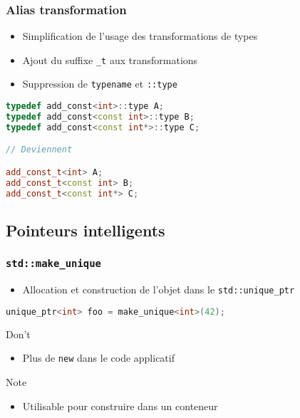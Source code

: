 \documentclass[C++.tex]{subfiles}
\begin{document}
\begin{frame}[fragile]
	\frametitle{Alias transformation}
	\begin{itemize}
		\item Simplification de l'usage des transformations de types
		\item Ajout du suffixe \lstinline|_t| aux transformations
		\item Suppression de \lstinline|typename| et \lstinline|::type|
	\end{itemize}

	\begin{lstlisting}[language=C++]
typedef add_const<int>::type A;
typedef add_const<const int>::type B;
typedef add_const<const int*>::type C;

// Deviennent

add_const_t<int> A;
add_const_t<const int> B;
add_const_t<const int*> C;\end{lstlisting}
\end{frame}

\subsection*{Pointeurs intelligents}
\begin{frame}[fragile]
	\frametitle{\lstinline|std::make_unique|}
	\begin{itemize}
		\item Allocation et construction de l'objet dans le \lstinline|std::unique_ptr|
	\end{itemize}

	\begin{lstlisting}[language=C++]
unique_ptr<int> foo = make_unique<int>(42);\end{lstlisting}

	\begin{alertblock}{Don't}
		\begin{itemize}
			\item Plus de \lstinline|new| dans le code applicatif
		\end{itemize}
	\end{alertblock}

	\begin{block}{Note}
		\begin{itemize}
			\item Utilisable pour construire dans un conteneur
		\end{itemize}
	\end{block}
\end{frame}
\end{document}
